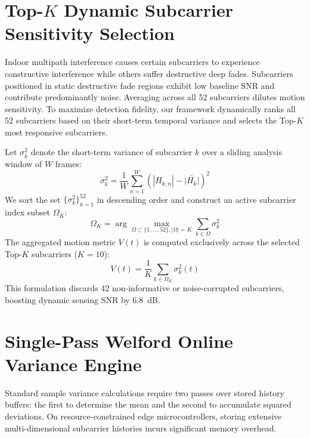 \section{Top-$K$ Dynamic Subcarrier Sensitivity Selection}
Indoor multipath interference causes certain subcarriers to experience constructive interference while others suffer destructive deep fades. Subcarriers positioned in static destructive fade regions exhibit low baseline SNR and contribute predominantly noise. Averaging across all 52 subcarriers dilutes motion sensitivity. To maximize detection fidelity, our framework dynamically ranks all 52 subcarriers based on their short-term temporal variance and selects the Top-$K$ most responsive subcarriers.

Let $\sigma_k^2$ denote the short-term variance of subcarrier $k$ over a sliding analysis window of $W$ frames:
\begin{equation}
\sigma_k^2 = \frac{1}{W} \sum_{n=1}^W \left( |H_{k, n}| - \bar{|H_k|} \right)^2
\label{eq:subcarrier_var}
\end{equation}
We sort the set $\{\sigma_k^2\}_{k=1}^{52}$ in descending order and construct an active subcarrier index subset $\Omega_K$:
\begin{equation}
\Omega_K = \arg\max_{\Omega \subset \{1,\dots,52\}, |\Omega|=K} \sum_{k \in \Omega} \sigma_k^2
\label{eq:topk}
\end{equation}
The aggregated motion metric $V(t)$ is computed exclusively across the selected Top-$K$ subcarriers ($K=10$):
\begin{equation}
V(t) = \frac{1}{K} \sum_{k \in \Omega_K} \sigma_k^2(t)
\label{eq:v_t}
\end{equation}
This formulation discards 42 non-informative or noise-corrupted subcarriers, boosting dynamic sensing SNR by 6.8~dB.

\section{Single-Pass Welford Online Variance Engine}
Standard sample variance calculations require two passes over stored history buffers: the first to determine the mean and the second to accumulate squared deviations. On resource-constrained edge microcontrollers, storing extensive multi-dimensional subcarrier histories incurs significant memory overhead.

